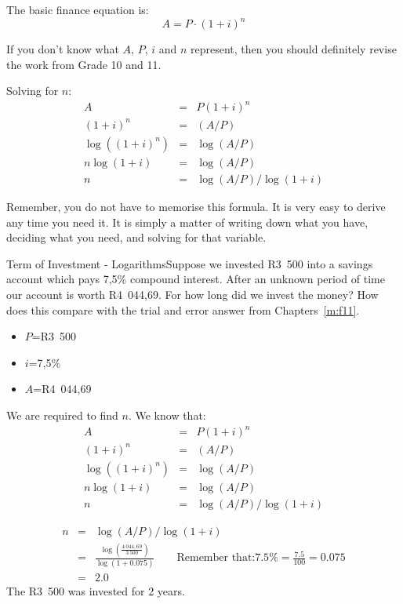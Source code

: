 The basic finance equation is:
\begin{equation*}
A = P \cdot (1+i)^n
\end{equation*}

If you don't know what $A$, $P$, $i$ and $n$ represent, then you should definitely revise the work from Grade 10 and 11.

Solving for $n$:
\begin{eqnarray*}
A &=& P(1+i)^n\\
(1+i)^n &=& (A/P)\\
\log((1+i)^n)&=&\log(A/P)\\
n\log(1+i)&=&\log(A/P)\\
n &=& \log(A/P) / \log(1+i)
\end{eqnarray*}

Remember, you do not have to memorise this formula. It is very easy to derive any time you need it. It is simply a matter of writing down what you have, deciding what you need, and solving for that variable.

\begin{wex}{Term of Investment - Logarithms}{Suppose we invested R3~500 into a savings account which pays 7,5\% compound interest. After an unknown period of time our account is worth R4~044,69. For how long did we invest the money? How does this compare with the trial and error answer from Chapters~\ref{m:f11}.}{
\begin{itemize}
\item{$P$=R3~500}
\item{$i$=7,5\%}
\item{$A$=R4~044,69}
\end{itemize}
We are required to find $n$.
We know that:
\begin{eqnarray*}
A &=& P(1+i)^n\\
(1+i)^n &=& (A/P)\\
\log((1+i)^n)&=&\log(A/P)\\
n\log(1+i)&=&\log(A/P)\\
n &=& \log(A/P) / \log(1+i)
\end{eqnarray*}

\begin{eqnarray*}
n &=& \log(A/P) / \log(1+i)\\
&=&\frac{\log(\frac{4~044,69}{3~500})}{\log(1+0.075)}\qquad \textrm{Remember that:}7.5\%=\frac{7.5}{100}=0.075\\
&=&2.0
\end{eqnarray*}
The R3~500 was invested for 2 years.}
\end{wex}

